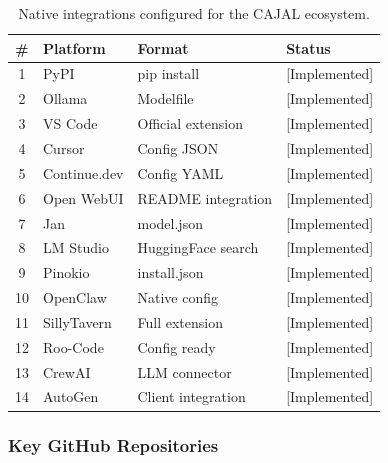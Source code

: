 \documentclass[11pt,a4paper]{article}
\theoremstyle{plain}
\theoremstyle{definition}
\theoremstyle{remark}
\begin{document}
\begin{table}[ht]
\centering
\caption{Native integrations configured for the CAJAL ecosystem.}
\label{tab:integrations}
\small\begin{tabular}{@{}clll@{}}
\toprule
\textbf{\#} & \textbf{Platform} & \textbf{Format} & \textbf{Status} \\
\midrule
1  & PyPI          & pip install           & [Implemented] \\
2  & Ollama        & Modelfile             & [Implemented] \\
3  & VS Code       & Official extension    & [Implemented] \\
4  & Cursor        & Config JSON           & [Implemented] \\
5  & Continue.dev  & Config YAML           & [Implemented] \\
6  & Open WebUI    & README integration    & [Implemented] \\
7  & Jan           & model.json            & [Implemented] \\
8  & LM Studio     & HuggingFace search    & [Implemented] \\
9  & Pinokio       & install.json          & [Implemented] \\
10 & OpenClaw      & Native config         & [Implemented] \\
11 & SillyTavern   & Full extension        & [Implemented] \\
12 & Roo-Code      & Config ready          & [Implemented] \\
13 & CrewAI        & LLM connector         & [Implemented] \\
14 & AutoGen       & Client integration    & [Implemented] \\
\bottomrule
\end{tabular}
\end{table}

\subsubsection{Key GitHub Repositories}
\end{document}
